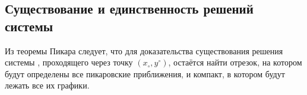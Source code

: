 \subsection{Существование и единственность решений системы}

Из теоремы Пикара следует, что для доказательства существования решения системы , проходящего через точку $ (x_\circ, y^\circ) $, остаётся найти отрезок, на котором будут определены все пикаровские приближения, и компакт, в котором будут лежать все их графики.

